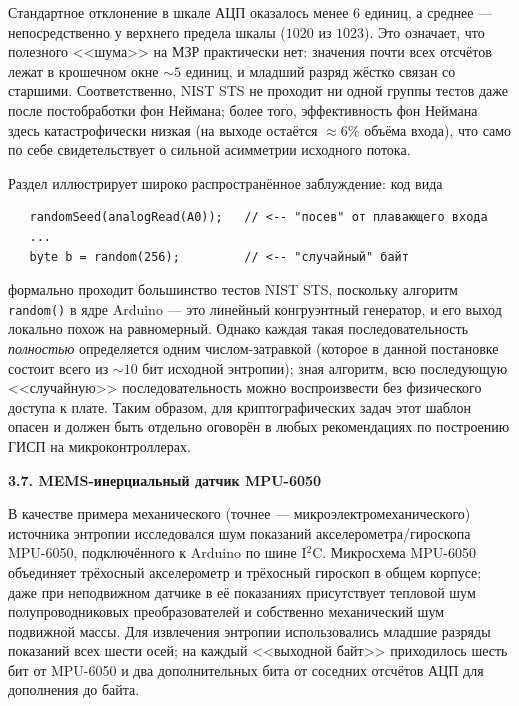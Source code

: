 Стандартное отклонение в шкале АЦП оказалось менее $6$ единиц, а среднее ---
непосредственно у верхнего предела шкалы ($1020$ из $1023$). Это означает, что
полезного <<шума>> на МЗР практически нет: значения почти всех отсчётов лежат
в крошечном окне $\sim 5$ единиц, и младший разряд жёстко связан со старшими.
Соответственно, NIST STS не проходит ни одной группы тестов даже после
постобработки фон Неймана; более того, эффективность фон Неймана здесь
катастрофически низкая (на выходе остаётся ${\approx} 6\%$ объёма входа),
что само по себе свидетельствует о сильной асимметрии исходного потока.

Раздел иллюстрирует широко распространённое заблуждение: код вида
\begin{verbatim}
   randomSeed(analogRead(A0));   // <-- "посев" от плавающего входа
   ...
   byte b = random(256);         // <-- "случайный" байт
\end{verbatim}
формально проходит большинство тестов NIST STS, поскольку алгоритм \texttt{random()}
в ядре Arduino --- это линейный конгруэнтный генератор, и его выход локально похож
на равномерный. Однако каждая такая последовательность \emph{полностью}
определяется одним числом-затравкой (которое в данной постановке состоит всего из
${\sim}10$ бит исходной энтропии); зная алгоритм, всю последующую <<случайную>>
последовательность можно воспроизвести без физического доступа к плате.
Таким образом, для криптографических задач этот шаблон опасен и должен быть отдельно
оговорён в любых рекомендациях по построению ГИСП на микроконтроллерах.

\textbf{3.7. MEMS-инерциальный датчик MPU-6050}

В качестве примера механического (точнее --- микроэлектромеханического) источника
энтропии исследовался шум показаний акселерометра/гироскопа MPU-6050, подключённого
к Arduino по шине I$^2$C. Микросхема MPU-6050 объединяет трёхосный акселерометр и
трёхосный гироскоп в общем корпусе; даже при неподвижном датчике в её показаниях
присутствует тепловой шум полупроводниковых преобразователей и собственно
механический шум подвижной массы. Для извлечения энтропии использовались
младшие разряды показаний всех шести осей; на каждый <<выходной байт>> приходилось
шесть бит от MPU-6050 и два дополнительных бита от соседних отсчётов АЦП для
дополнения до байта.

